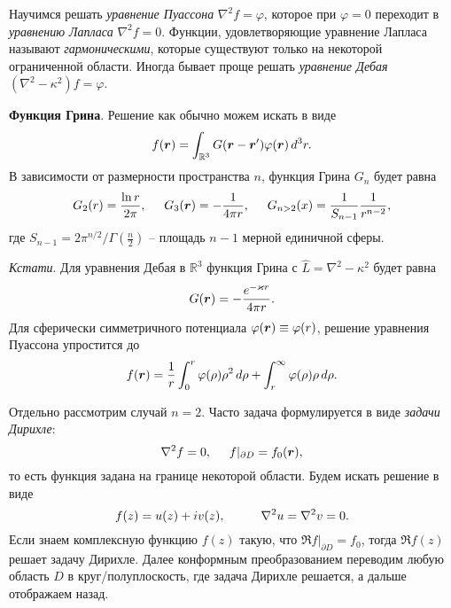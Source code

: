 

Научимся решать \textit{уравнение Пуассона} $\nabla^2 f  = \varphi$, которое при $\varphi = 0$ переходит в \textit{уравнению Лапласа} $\nabla^2 f = 0$. 
Функции, удовлетворяющие уравнение Лапласа называют \textit{гармоническими}, которые существуют только на некоторой ограниченной области. 
Иногда бывает проще решать \textit{уравнение Дебая} $(\nabla^2 - \kappa^2) f = \varphi$.


\textbf{Функция Грина}. Решение как обычно можем искать в виде
\begin{equation*}
    f(\mbox{\boldmath $r$}) = \int_{\mathbb{R}^3} G(\mbox{\boldmath $r$}  - \mbox{\boldmath $r$}') \varphi(\mbox{\boldmath $r$}) \, d^3 r.
\end{equation*}
В зависимости от размерности пространства $n$, функция Грина $G_n$ будет равна
\begin{equation}
    G_2(r) = \frac{\ln r}{2 \pi},
    \hspace{5 mm} 
    G_3(\mbox{\boldmath $r$}) = - \frac{1}{4 \pi r},
    \hspace{5 mm} 
    G_{n > 2}(x) = \frac{1}{S_{n-1}} \frac{1}{r^{n-2}},
\end{equation}
где $S_{n-1} = 2 \pi^{n/2} / \Gamma\left(\frac{n}{2}\right)$ -- площадь $n-1$ мерной единичной сферы.

\textit{Кстати}. 
Для уравнения Дебая в $\mathbb{R}^3$ функция Грина с $\hat{L} = \nabla^2 - \kappa^2$ будет равна
\begin{equation*}
    G(\mbox{\boldmath $r$}) = - \frac{e^{- \varkappa r}}{4 \pi r}.
\end{equation*}
Для сферически симметричного потенциала $\varphi(\mbox{\boldmath $r$}) \equiv \varphi(r)$, решение уравнения Пуассона упростится до 
\begin{equation*}
    f(\mbox{\boldmath $r$}) = \frac{1}{r} \int_{0}^{r} \varphi(\rho) \rho^2 \, d \rho + \int_{r}^{\infty} \varphi(\rho) \rho \, d \rho.
\end{equation*}



Отдельно рассмотрим случай $n=2$. Часто задача формулируется в виде \textit{задачи Дирихле}:
\begin{equation*}
    \nabla^2 f = 0, 
    \hspace{5 mm} 
    f|_{\partial D} = f_0 (\mbox{\boldmath $r$}),
\end{equation*}
то есть функция задана на границе некоторой области. Будем искать решение в виде
\begin{equation*}
    f(z) = u(z) + i v(z),
    \hspace{10 mm} 
    \nabla^2 u = \nabla^2 v = 0.
\end{equation*}
Если знаем комплексную функцию $f(z)$ такую, что $\Re f |_{\partial D} = f_0$, тогда $\Re f(z)$ решает задачу Дирихле.
Далее конформным преобразованием переводим любую область $D$ в круг/полуплоскость, где задача Дирихле решается, а дальше отображаем назад. 

